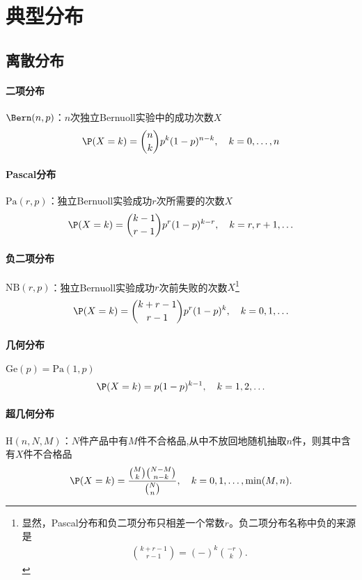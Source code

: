 \iffalse
\clearpage
\appendiks
\section{典型分布}
\subsection{离散分布}
\paragraph{二项分布}$\Bern(n,p)$：$n$次独立Bernuoll实验中的成功次数$X$
\begin{align}
	\P(X=k)={n\choose k}p^k(1-p)^{n-k},\quad k=0,\ldots,n
\end{align}
\paragraph{Pascal分布}$\mathrm{Pa}(r,p)$：独立Bernuoll实验成功$r$次所需要的次数$X$
\begin{align}
	\P(X=k)={k-1\choose r-1}p^r(1-p)^{k-r},\quad k=r,r+1,\ldots
\end{align}
\paragraph{负二项分布}$\mathrm{NB}(r,p)$：独立Bernuoll实验成功$r$次前失败的次数$X$\footnote{显然，Pascal分布和负二项分布只相差一个常数$r$。负二项分布名称中负的来源是\begin{align}
	{k+r-1\choose r-1}=(-)^k{-r\choose k}.
\end{align}}
\begin{align}
	\P(X=k)={k+r-1\choose r-1}p^r(1-p)^k,\quad k=0,1,\ldots
\end{align}
\paragraph{几何分布}$\mathrm{Ge}(p)=\mathrm{Pa}(1,p)$
\begin{align}
	\P(X=k)=p(1-p)^{k-1},\quad k=1,2,\ldots
\end{align}
\paragraph{超几何分布}$\mathrm H(n,N,M)$：$N$件产品中有$M$件不合格品,从中不放回地随机抽取$n$件，则其中含有$X$件不合格品
\begin{align}
	\P(X=k)=\frac{{M\choose k}{N-M\choose n-k}}{{N\choose n}},\quad k=0,1,\ldots,\min(M,n).
\end{align}
